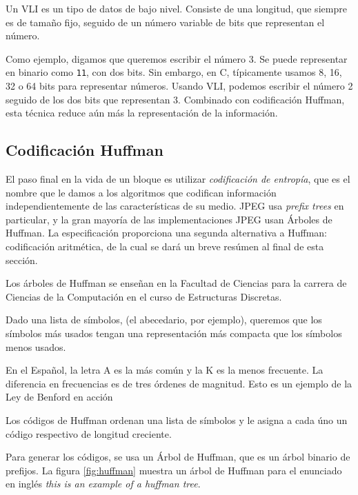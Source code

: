 Un VLI es un tipo de datos de bajo nivel. Consiste de una longitud, que siempre
es de tamaño fijo, seguido de un número variable de bits que representan el
número.

Como ejemplo, digamos que queremos escribir el número 3. Se puede representar
en binario como \verb+11+, con dos bits. Sin embargo, en C, típicamente usamos
8, 16, 32 o 64 bits para representar números. Usando VLI, podemos escribir el
número 2 seguido de los dos bits que representan 3. Combinado con codificación
Huffman, esta técnica reduce aún más la representación de la información.



\subsection{Codificación Huffman}\label{sub:huffman}

El paso final en la vida de un bloque es utilizar \emph{codificación de
entropía}, que es el nombre que le damos a los algoritmos que codifican
información independientemente de las características de su medio. JPEG usa
\emph{prefix trees} en particular, y la gran mayoría de las implementaciones
JPEG usan Árboles de Huffman. La especificación proporciona una segunda
alternativa a Huffman: codificación aritmética, de la cual se dará un breve
resúmen al final de esta sección.

Los árboles de Huffman se enseñan en la Facultad de Ciencias para la carrera de
Ciencias de la Computación en el curso de Estructuras Discretas.

Dado una lista de símbolos, (el abecedario, por ejemplo), queremos que los
símbolos más usados tengan una representación más compacta que los símbolos
menos usados.

En el Español, la letra A es la más común y la K es la menos frecuente.
\cite{Espanol} La diferencia en frecuencias es de tres órdenes de magnitud.
Esto es un ejemplo de la Ley de Benford en acción \cite{Benford}

Los códigos de Huffman ordenan una lista de símbolos y le asigna a cada úno un
código respectivo de longitud creciente.

Para generar los códigos, se usa un Árbol de Huffman, que es un árbol binario
de prefijos. La figura \ref{fig:huffman} muestra un árbol de Huffman para el
enunciado en inglés \emph{this is an example of a huffman tree}.

